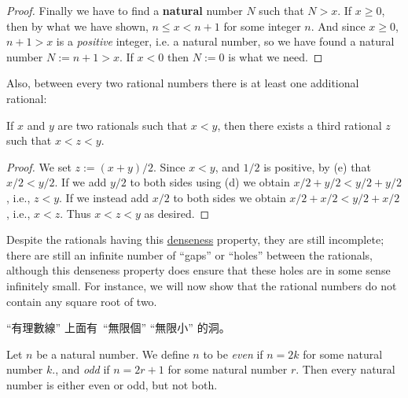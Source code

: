 \begin{proof}
Finally we have to find a \textbf{natural} number \(N\) such that \(N > x\).
If \(x \ge 0\), then by what we have shown, \(n \le x < n + 1\) for some integer \(n\).
And since \(x \ge 0\), \(n + 1 > x\) is a \emph{positive} integer, i.e. a natural number, so we have found a natural number \(N := n + 1 > x\).
If \(x < 0\) then \(N := 0\) is what we need.
\end{proof}

Also, between every two rational numbers there is at least one additional rational:

\begin{proposition}  \label{prop 4.4.3}
If \(x\) and \(y\) are two rationals such that \(x < y\), then there exists a third rational \(z\) such that \(x < z < y\).
\end{proposition}

\begin{proof}
We set \(z := (x + y)/2\).
Since \(x < y\), and \(1 / 2\) is positive, by (e) that \(x / 2 < y / 2\).
If we add \(y / 2\) to both sides using (d) we obtain \(x / 2 + y / 2 < y / 2 + y / 2\), i.e., \(z < y\).
If we instead add \(x / 2\) to both sides we obtain \(x / 2 + x / 2 < y / 2 + x / 2\), i.e., \(x < z\).
Thus \(x < z < y\) as desired.
\end{proof}

\begin{note}
Despite the rationals having this \href{https://en.wikipedia.org/wiki/Dense_set}{denseness} property, they are still incomplete;
there are still an infinite number of ``gaps'' or ``holes'' between the rationals, although this denseness property does ensure that these holes are in some sense infinitely small.
For instance, we will now show that the rational numbers do not contain any square root of two.
\end{note}

\begin{note}
``有理數線'' 上面有\ ``無限個'' ``無限小'' 的洞。
\end{note}

\begin{additional corollary} \label{ac 4.4.1}
Let \(n\) be a natural number.
We define \(n\) to be \emph{even} if \(n = 2k\) for some natural number \(k\)., and \emph{odd} if \(n = 2r + 1\) for some natural number \(r\).
Then every natural number is either even or odd, but not both.
\end{additional corollary}

